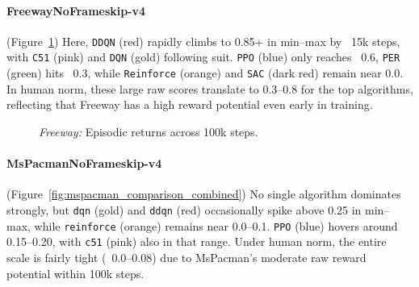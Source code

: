 \paragraph{FreewayNoFrameskip-v4}
(Figure~\ref{fig:freeway_comparison_combined})
Here, \texttt{DDQN} (red) rapidly climbs to 0.85+ in min--max by ~15k steps, 
with \texttt{C51} (pink) and \texttt{DQN} (gold) following suit. 
\texttt{PPO} (blue) only reaches ~0.6, 
\texttt{PER} (green) hits ~0.3, while \texttt{Reinforce} (orange) and \texttt{SAC} (dark red) 
remain near 0.0. 
In human norm, these large raw scores translate to 0.3--0.8 for the top algorithms, 
reflecting that Freeway has a high reward potential even early in training.
\begin{figure} 
	\centering
	\quad
	\caption{\emph{Freeway:} Episodic returns across 100k steps.}
	\label{fig:freeway_comparison_combined}
\end{figure}

\paragraph{MsPacmanNoFrameskip-v4}
(Figure~\ref{fig:mspacman_comparison_combined})
No single algorithm dominates strongly, but \texttt{dqn} (gold) and \texttt{ddqn} (red) 
occasionally spike above 0.25 in min--max, while \texttt{reinforce} (orange) remains 
near 0.0--0.1. \texttt{PPO} (blue) hovers around 0.15--0.20, 
with \texttt{c51} (pink) also in that range. 
Under human norm, the entire scale is fairly tight (~0.0--0.08) 
due to MsPacman’s moderate raw reward potential within 100k steps.

